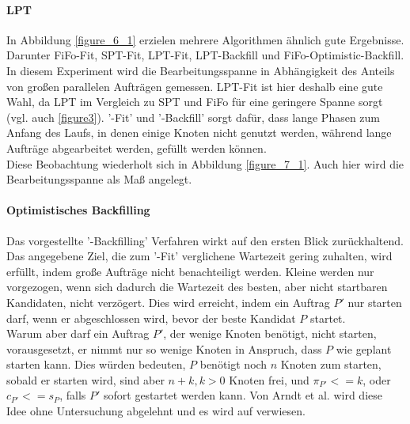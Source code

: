 \paragraph{LPT}
In Abbildung \ref{figure_6_1} erzielen mehrere Algorithmen ähnlich  gute Ergebnisse. Darunter FiFo-Fit, SPT-Fit, LPT-Fit, LPT-Backfill und FiFo-Optimistic-Backfill. In diesem Experiment wird die Bearbeitungsspanne in Abhängigkeit des Anteils von großen parallelen Aufträgen gemessen. LPT-Fit ist hier deshalb eine gute Wahl, da LPT im Vergleich zu SPT und FiFo für eine geringere Spanne sorgt (vgl. auch \ref{figure3}). '-Fit' und '-Backfill' sorgt dafür, dass lange Phasen zum Anfang des Laufs, in denen einige Knoten nicht genutzt werden, während lange Aufträge abgearbeitet werden, gefüllt werden können.\\
Diese Beobachtung wiederholt sich in Abbildung \ref{figure_7_1}. Auch hier wird die Bearbeitungsspanne als Maß angelegt.


\paragraph{Optimistisches Backfilling}
\label{optfill}
Das vorgestellte '-Backfilling' Verfahren wirkt auf den ersten Blick zurückhaltend. Das angegebene Ziel, die zum '-Fit' verglichene Wartezeit gering zuhalten, wird erfüllt, indem große Aufträge nicht benachteiligt werden. Kleine werden nur vorgezogen, wenn sich dadurch die Wartezeit des besten, aber nicht startbaren Kandidaten, nicht verzögert. Dies wird erreicht, indem ein Auftrag $P'$ nur starten darf, wenn er abgeschlossen wird, bevor der beste Kandidat $P$ startet.\\
Warum aber darf ein Auftrag $P'$, der wenige Knoten benötigt, nicht starten, vorausgesetzt, er nimmt nur so wenige Knoten in Anspruch, dass $P$ wie geplant starten kann. Dies würden bedeuten, $P$ benötigt noch $n$ Knoten zum starten, sobald er starten wird, sind aber $n+k, k>0$ Knoten frei, und $\pi_{P'} <= k$, oder $c_{P'} <= s_P$, falls $P'$ sofort gestartet werden kann. 
Von Arndt et al. wird diese Idee ohne Untersuchung abgelehnt und es wird auf \cite{optVsCons} verwiesen.\\

